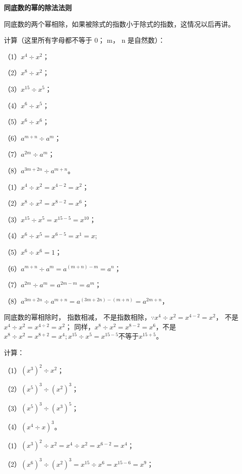\textbf{同底数的幂的除法法则}

同底数的两个幂相除，如果被除式的指数小于除式的指数，这情况以后再讲。

 计算（这里所有字母都不等于 0； m， n 是自然数）：

（1）\(x^{4} \div x^{2}\)；

（2）\(x^{8} \div x^{2}\)；

（3）\(x^{15} \div x^5\)；

（4）\(x^{6} \div x^{5}\)；

（5）\(x^{6} \div x^{6}\)；

（6）\(a^{m + n} \div a^m\)；

（7）\(a^{2m} \div a^m\)；

（8）\(a^{3m + 2n} \div a^{m + n}\)。


（1）\(x^{4} \div x^{2} = x^{4 - 2} = x^{2}\)；

（2）\(x^{8} \div x^{2} = x^{8 - 2} = x^{6}\)；

（3）\(x^{15} \div x^5 = x^{15 - 5} = x^{10}\)；

（4）\(x^{6} \div x^{5} = x^{6 - 5} = x^{1} = x;\)

（5）\(x^{6} \div x^{6} = 1\)；

（6）\(a^{m + n} \div a^m = a^{(m + n) - m} = a^n\)；

（7）\(a^{2m} \div a^{m} = a^{2m - m} = a^{m}\)；

（8）\(a^{3m + 2n} \div a^{m + n} = a^{(3m + 2n) - (m + n)} = a^{2m + n}\)，

 同底数的幂相除时， 指数相减，
不是指数相除，\(\because x^{4} \div x^{2} = x^{4-2} = x^{2}\)，
不是\(x^{4} \div x^{2} = x^{4\div2} = x^{2}\)；
同样，\(x^{8} \div x^{2} = x^{8-2} = x^{6}\)，不是\(x^{8} \div x^{2} = x^{8 + 2} = x^{4}; x^{15} \div x^{5} = x^{15 - 5}\)不等于\(x^{15 + 5}\)。

 计算：

（1）\((x^{3})^{2} \div x^{2}\)；

（2）\((x^{5})^{3} \div (x^{2})^{3}\)；

（3）\((x^{5})^{3} \div (x^{3})^{5}\)；

（4）\((x^{4} \div x)^{3}\)。

（1）\((x^{3})^{2} \div x^{2} = x^{4} \div x^{2} = x^{6 - 2} = x^{4}\)；

（2）\((x^{6})^{3} \div (x^{2})^{3} = x^{15} \div x^{6} = x^{15 - 6} = x^{9}\)；

